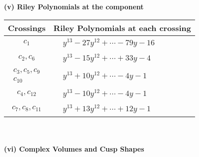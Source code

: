 \documentclass[1p]{elsarticle_modified}
\theoremstyle{definition}
\begin{document}
\newpage\renewcommand{\arraystretch}{1}
\flushleft \textbf{(v) Riley Polynomials at the component}\newline \\
\begin{tabular}{m{50pt}|m{274pt}}
Crossings & \hspace{64pt}Riley Polynomials at each crossing \\
\hline $$\begin{aligned}c_{1}\end{aligned}$$&$\begin{aligned}
&y^{13}-27 y^{12}+\cdots-79 y-16
\end{aligned}$\\
\hline $$\begin{aligned}c_{2},c_{6}\end{aligned}$$&$\begin{aligned}
&y^{13}-15 y^{12}+\cdots+33 y-4
\end{aligned}$\\
\hline $$\begin{aligned}c_{3},c_{5},c_{9}\\c_{10}\end{aligned}$$&$\begin{aligned}
&y^{13}+10 y^{12}+\cdots-4 y-1
\end{aligned}$\\
\hline $$\begin{aligned}c_{4},c_{12}\end{aligned}$$&$\begin{aligned}
&y^{13}-10 y^{12}+\cdots-4 y-1
\end{aligned}$\\
\hline $$\begin{aligned}c_{7},c_{8},c_{11}\end{aligned}$$&$\begin{aligned}
&y^{13}+13 y^{12}+\cdots+12 y-1
\end{aligned}$\\
\hline
\end{tabular}\\~\\
\newpage\flushleft \textbf{(vi) Complex Volumes and Cusp Shapes}
\end{document}
